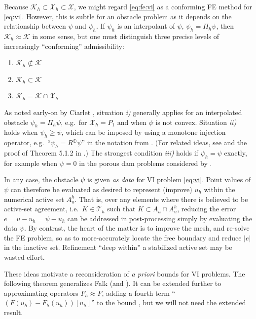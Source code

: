 \documentclass[]{interact}
\theoremstyle{plain}%
\theoremstyle{definition}
\theoremstyle{remark}
\newcommand{\cK}{\mathcal{K}}
\newcommand{\cT}{\mathcal{T}}
\newcommand{\cX}{\mathcal{X}}
\begin{document}
Because $\cK_h \subset \cX_h \subset \cX$, we might regard \eqref{eq:fe:vi} as a conforming FE method for \eqref{eq:vi}.  However, this is subtle for an obstacle problem as it depends on the relationship between $\psi$ and $\psi_h$.  If $\psi_h$ is an interpolant of $\psi$, $\psi_h = \Pi_h \psi$, then $\cK_h \approx \cK$ in some sense, but one must distinguish three precise levels of increasingly ``conforming'' admissibility:
\renewcommand{\labelenumi}{\emph{\roman{enumi})}}
\begin{enumerate}
\item $\cK_h \not \subset \cK$
\item $\cK_h \subset \cK$
\item $\cK_h = \cK \cap \cX_h$
\end{enumerate}
As noted early-on by Ciarlet \cite[Figure 5.1.3]{Ciarlet2002}, situation \emph{i)} generally applies for an interpolated obstacle $\psi_h = \Pi_h \psi$, e.g.~for $\cX_h=P_1$ and when $\psi$ is not convex.  Situation \emph{ii)} holds when $\psi_h \ge \psi$, which can be imposed by using a monotone injection operator, e.g.~``$\psi_h = R^\oplus \psi$'' in the notation from \cite{BuelerFarrell2024}.  (For related ideas, see \cite{GraeserKornhuber2009} and the proof of Theorem 5.1.2 in \cite{Ciarlet2002}.)  The strongest condition \emph{iii)} holds if $\psi_h=\psi$ exactly, for example when $\psi=0$ in the porous dam problems considered by \cite{AinsworthOdenLee1993}.

In any case, the obstacle $\psi$ is given \emph{as data} for VI problem \eqref{eq:vi}.  Point values of $\psi$ can therefore be evaluated as desired to represent (improve) $u_h$ within the numerical active set $A_u^h$.  That is, over any elements where there is believed to be active-set agreement, i.e.~$K\in\cT_h$ such that $K \subset A_u \cap A_u^h$, reducing the error $e=u-u_h=\psi-u_h$ can be addressed in post-processing simply by evaluating the data $\psi$.  By contrast, the heart of the matter is to improve the mesh, and re-solve the FE problem, so as to more-accurately locate the free boundary and reduce $|e|$ in the inactive set.  Refinement ``deep within'' a stabilized active set may be wasted effort.

These ideas motivate a reconsideration of \emph{a priori} bounds for VI problems.  The following theorem generalizes Falk \cite{Falk1974} (and \cite[Theorem 5.1.1]{Ciarlet2002}).  It can be extended further to approximating operators $F_h\approx F$, adding a fourth term ``$(F(u_h)-F_h(u_h))[u_h]$'' to the bound \cite[Theorem 6.3]{Bueler2024}, but we will not need the extended result.
\end{document}
